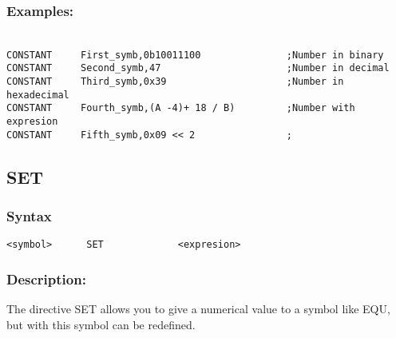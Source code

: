         \subsubsection{Examples:}
      {
            ~\\
            \usecodefont
            \verb'CONSTANT     First_symb,0b10011100               ;Number in binary'\\
            \verb'CONSTANT     Second_symb,47                      ;Number in decimal'\\
            \verb'CONSTANT     Third_symb,0x39                     ;Number in hexadecimal'\\
            \verb'CONSTANT     Fourth_symb,(A -4)+ 18 / B)         ;Number with expresion'\\
            \verb'CONSTANT     Fifth_symb,0x09 << 2                ;'\\
        }

    \subsection{SET}
        \subsubsection{Syntax}
            \verb'<symbol>      SET             <expresion>'

        \subsubsection{Description:}
            The directive SET allows you to give a numerical value to a symbol like EQU, but with this symbol can be redefined.

